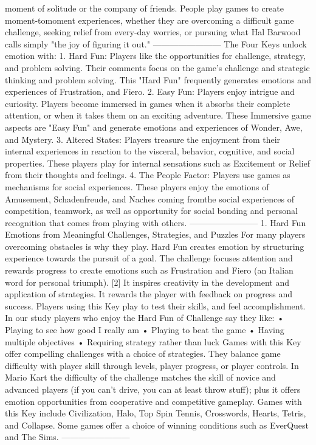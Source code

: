 moment of solitude or the company of friends. People play games to create moment-tomoment 
experiences, whether they are overcoming a difficult game challenge, seeking relief from 
every-day worries, or pursuing what Hal Barwood calls simply "the joy of figuring it out."
------------------------
The Four Keys unlock emotion with:
1. Hard Fun: Players like the opportunities for challenge, strategy, and problem
solving. Their comments focus on the game's challenge and strategic thinking and
problem solving. This "Hard Fun" frequently generates emotions and experiences of
Frustration, and Fiero.
2. Easy Fun: Players enjoy intrigue and curiosity. Players become immersed in games
when it absorbs their complete attention, or when it takes them on an exciting
adventure. These Immersive game aspects are "Easy Fun" and generate emotions
and experiences of Wonder, Awe, and Mystery.
3. Altered States: Players treasure the enjoyment from their internal experiences in
reaction to the visceral, behavior, cognitive, and social properties. These players
play for internal sensations such as Excitement or Relief from their thoughts and
feelings.
4. The People Factor: Players use games as mechanisms for social experiences.
These players enjoy the emotions of Amusement, Schadenfreude, and Naches
coming fromthe social experiences of competition, teamwork, as well as opportunity
for social bonding and personal recognition that comes from playing with others.
------------------------
1. Hard Fun
Emotions from Meaningful Challenges, Strategies, and Puzzles
For many players overcoming obstacles is why they play. Hard Fun creates emotion by
structuring experience towards the pursuit of a goal. The challenge focuses attention and
rewards progress to create emotions such as Frustration and Fiero (an Italian word for
personal triumph). [2] It inspires creativity in the development and application of strategies. It
rewards the player with feedback on progress and success. Players using this Key play to test
their skills, and feel accomplishment. In our study players who enjoy the Hard Fun of
Challenge say they like:
• Playing to see how good I really am
• Playing to beat the game
• Having multiple objectives
• Requiring strategy rather than luck
Games with this Key offer compelling challenges with a choice of strategies. They balance
game difficulty with player skill through levels, player progress, or player controls. In Mario Kart
the difficulty of the challenge matches the skill of novice and advanced players (if you can't
drive, you can at least throw stuff); plus it offers emotion opportunities from cooperative and
competitive gameplay. Games with this Key include Civilization, Halo, Top Spin Tennis,
Crosswords, Hearts, Tetris, and Collapse. Some games offer a choice of winning conditions
such as EverQuest and The Sims.
------------------------

